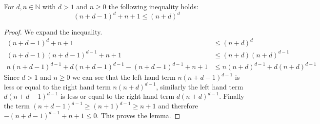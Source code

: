 
\begin{lemma}
	\label{lem_md_ineq}
	For $d,n \in \mathbb{N}$ with $d>1$ and $n \geq 0$ the following inequality holds:
	\[ (n+d-1)^d + n+1 \leq (n+d)^d \]
	\begin{proof}
		We expand the inequality.
		\begin{align*}
		(n+d-1)^d + n + 1 & \leq (n+d)^d\\
		(n+d-1)(n+d-1)^{d-1} + n + 1 & \leq (n+d)(n+d)^{d-1}\\
		n(n+d-1)^{d-1} + d(n+d-1)^{d-1} - (n+d-1)^{d-1} + n + 1 & \leq n(n+d)^{d-1} + d(n+d)^{d-1}
		\end{align*}
		Since $d > 1$ and $n \geq 0$ we can see that the left hand term $n(n+d-1)^{d-1}$ is less or equal to the right hand term $n(n+d)^{d-1}$, similarly the left hand term $d(n+d-1)^{d-1}$ is less or equal to the right hand term $d(n+d)^{d-1}$. Finally the term $(n+d-1)^{d-1} \geq (n+1)^{d-1} \geq n+1$ and therefore $- (n+d-1)^{d-1} + n + 1  \leq 0$. This proves the lemma.
	\end{proof}
\end{lemma}